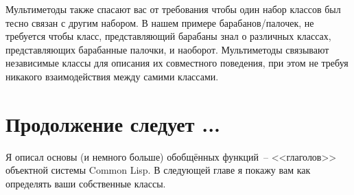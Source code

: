 Мультиметоды также спасают вас от требования чтобы один набор классов был тесно связан с
другим набором. В нашем примере барабанов/палочек, не требуется чтобы класс,
представляющий барабаны знал о различных классах, представляющих барабанные палочки, и
наоборот.  Мультиметоды связывают независимые классы для описания их совместного
поведения, при этом не требуя никакого взаимодействия между самими классами.

\section{Продолжение следует ...}

Я описал основы (и немного больше) обобщённых функций~-- <<глаголов>> объектной системы
Common Lisp.  В следующей главе я покажу вам как определять ваши собственные классы.

